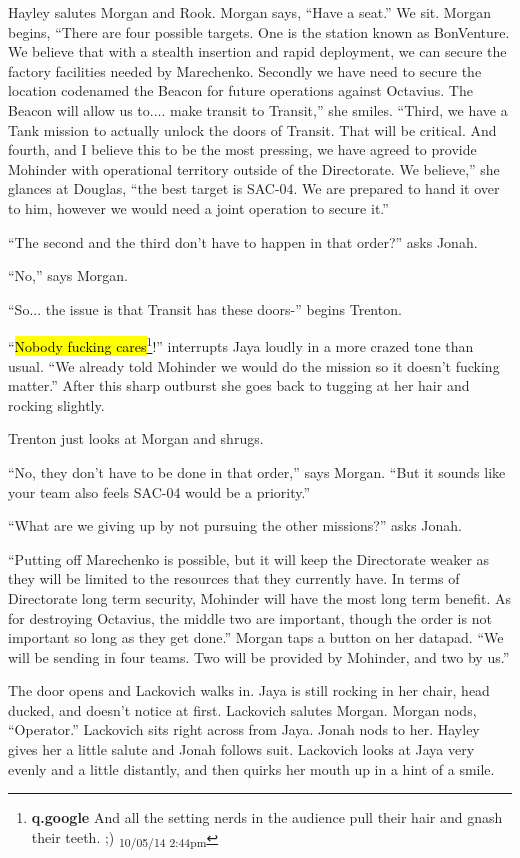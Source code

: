 Hayley salutes Morgan and Rook.  Morgan says, ``Have a seat.''  We sit.  Morgan begins, ``There are four possible targets.  One is the station known as BonVenture.  We believe that with a stealth insertion and rapid deployment, we can secure the factory facilities needed by Marechenko.  Secondly we have need to secure the location codenamed the Beacon for future operations against Octavius.  The Beacon will allow us to.... make transit to Transit,'' she smiles.  ``Third, we have a Tank mission to actually unlock the doors of Transit.  That will be critical.  And fourth, and I believe this to be the most pressing, we have agreed to provide Mohinder with operational territory outside of the Directorate.  We believe,'' she glances at Douglas, ``the best target is SAC-04.  We are prepared to hand it over to him, however we would need a joint operation to secure it.''

``The second and the third don't have to happen in that order?'' asks Jonah.

``No,'' says Morgan.  

``So... the issue is that Transit has these doors-'' begins Trenton.

``\hl{Nobody fucking cares}\footnote{\textbf{q.google }And all the setting nerds in the audience pull their hair and gnash their teeth. ;) \textsubscript{10/05/14 2:44pm}}!'' interrupts Jaya loudly in a more crazed tone than usual.  ``We already told Mohinder we would do the mission so it doesn't fucking matter.''  After this sharp outburst she goes back to tugging at her hair and rocking slightly.

Trenton just looks at Morgan and shrugs.  

``No, they don't have to be done in that order,'' says Morgan.  ``But it sounds like your team also feels SAC-04 would be a priority.''

``What are we giving up by not pursuing the other missions?'' asks Jonah.

``Putting off Marechenko is possible, but it will keep the Directorate weaker as they will be limited to the resources that they currently have.  In terms of Directorate long term security, Mohinder will have the most long term benefit.  As for destroying Octavius, the middle two are important, though the order is not important so long as they get done.''  Morgan taps a button on her datapad.  ``We will be sending in four teams.  Two will be provided by Mohinder, and two by us.''

The door opens and Lackovich walks in.  Jaya is still rocking in her chair, head ducked, and doesn't notice at first.  Lackovich salutes Morgan.  Morgan nods, ``Operator.''   Lackovich sits right across from Jaya.  Jonah nods to her.  Hayley gives her a little salute and Jonah follows suit.  Lackovich looks at Jaya very evenly and a little distantly, and then quirks her mouth up in a hint of a smile.

